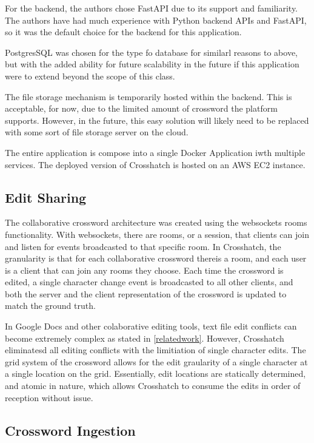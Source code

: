 \documentclass{article}
\begin{document}
For the backend, the authors chose FastAPI due to its support and familiarity. The authors have had much experience with Python backend APIs
and FastAPI, so it was the default choice for the backend for this application.

PostgresSQL was chosen for the type fo database for similarl reasons to above, but with the added ability for future scalability in the
future if this application were to extend beyond the scope of this class.

The file storage mechanism is temporarily hosted within the backend. This is acceptable, for now, due to the limited amount of crossword the platform supports.
However, in the future, this easy solution will likely need to be replaced with some sort of file storage server on the cloud.

The entire application is compose into a single Docker Application iwth multiple services. The deployed version of Crosshatch is hosted on an AWS EC2 instance.
\subsection{Edit Sharing}
\label{editsharing}

The collaborative crossword architecture was created using the websockets rooms functionality. With websockets, there are rooms,
or a session, that clients can join and listen for events broadcasted to that specific room. In Crosshatch, the granularity is that
for each collaborative crossword thereis a room, and each user is a client that can join any rooms they choose. Each time the crossword is edited,
a single character change event is broadcasted to all other clients, and both the server and the client representation of the crossword is updated
to match the ground truth.

In Google Docs and other colaborative editing tools, text file edit conflicts can become extremely complex as stated in \ref{relatedwork}. However, Crosshatch eliminatesd all
editing conflicts with the limitiation of single character edits. The grid system of the crossword allows for the edit graularity of a single character at a single location on the grid.
Essentially, edit locations are statically determined, and atomic in nature, which allows Crosshatch to consume the edits in order of reception without issue. 

\subsection{Crossword Ingestion}
\end{document}
